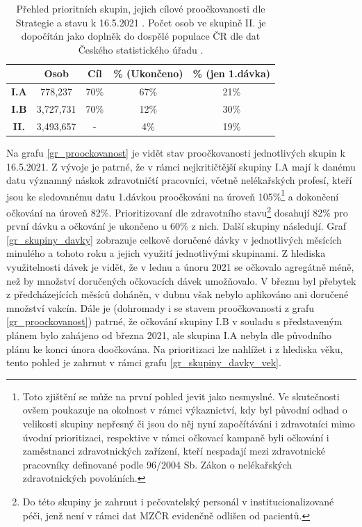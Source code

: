\begin{table}
\begin{minipage}{\textwidth} 
\begin{centering}
\begin{tabular}{|c|c|c|c|c|}
\hline
& \textbf{Osob} & \textbf{Cíl} & \textbf{\% (Ukončeno)} & \textbf{\% (jen 1.dávka)}  \\
\hline
\textbf{I.A} & 778,237 & 70\% & 67\% & 21\% \\
\hline
\textbf{I.B} & 3,727,731 & 70\% & 12\% & 30\%\\
\hline
\textbf{II.} & 3,493,657 & - & 4\% & 19\% \\
\hline
\end{tabular}
	\caption{Přehled prioritních skupin, jejich cílové proočkovanosti dle Strategie a stavu k 16.5.2021 \cite{strategie_covid}. Počet osob ve skupině II. je dopočítán jako doplněk do dospělé populace ČR dle dat Českého statistického úřadu \cite{obyvatele_pocet}.}
    \label{tab_skupiny}
    
    \end{centering}
\end{minipage}
\end{table}


Na grafu \ref{gr_proockovanost} je vidět stav proočkovanosti jednotlivých skupin k 16.5.2021. Z vývoje je patrné, že v rámci nejkritičtější skupiny I.A mají k danému datu významný náskok zdravotničtí pracovníci, včetně nelékařských profesí, kteří jsou ke sledovanému datu 1.dávkou proočkováni na úroveň 105\%\footnote{Toto zjištění se může na první pohled jevit jako nesmyslné. Ve skutečnosti ovšem poukazuje na okolnost v rámci výkaznictví, kdy byl původní odhad o velikosti skupiny nepřesný či jsou do něj nyní započítáváni i zdravotníci mimo úvodní prioritizaci, respektive v rámci očkovací kampaně byli očkování i zaměstnanci zdravotnických zařízení, kteří nespadají mezi zdravotnické pracovníky definované podle 96/2004 Sb. Zákon o nelékařských zdravotnických povoláních.} a dokončení očkování na úroveň 82\%. Prioritizovaní dle zdravotního stavu\footnote{Do této skupiny je zahrnut i pečovatelský personál v institucionalizované péči, jenž není v rámci dat MZČR evidenčně odlišen od pacientů.} dosahují 82\% pro první dávku a očkování je ukončeno u 60\% z nich. Další skupiny následují. 
%
Graf \ref{gr_skupiny_davky} zobrazuje celkově doručené dávky v jednotlivých měsících minulého a tohoto roku a jejich využití jednotlivými skupinami. Z hlediska využitelnosti dávek je vidět, že v lednu a únoru 2021 se očkovalo agregátně méně, než by množství doručených očkovacích dávek umožňovalo. V březnu byl přebytek z předcházejících měsíců doháněn, v dubnu však nebylo aplikováno ani doručené množství vakcín. Dále je (dohromady i se stavem proočkovanosti z grafu \ref{gr_proockovanost}) patrné, že očkování skupiny I.B v souladu s představeným plánem bylo zahájeno od března 2021, ale skupina I.A nebyla dle původního plánu ke konci února doočkována.
%
Na prioritizaci lze nahlížet i z hlediska věku, tento pohled je zahrnut v rámci grafu \ref{gr_skupiny_davky_vek}.



